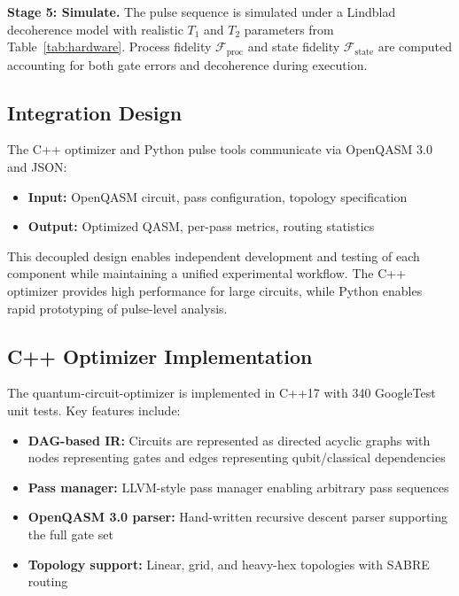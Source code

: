 \documentclass[journal]{IEEEtran}
\newcommand{\fid}{\mathcal{F}}
\begin{document}
\textbf{Stage 5: Simulate.} The pulse sequence is simulated under a Lindblad decoherence model with realistic $T_1$ and $T_2$ parameters from Table~\ref{tab:hardware}. Process fidelity $\fid_{\text{proc}}$ and state fidelity $\fid_{\text{state}}$ are computed accounting for both gate errors and decoherence during execution.

\subsection{Integration Design}

The C++ optimizer and Python pulse tools communicate via OpenQASM 3.0 and JSON:
\begin{itemize}
    \item \textbf{Input:} OpenQASM circuit, pass configuration, topology specification
    \item \textbf{Output:} Optimized QASM, per-pass metrics, routing statistics
\end{itemize}

This decoupled design enables independent development and testing of each component while maintaining a unified experimental workflow. The C++ optimizer provides high performance for large circuits, while Python enables rapid prototyping of pulse-level analysis.

\subsection{C++ Optimizer Implementation}

The quantum-circuit-optimizer is implemented in C++17 with 340 GoogleTest unit tests. Key features include:

\begin{itemize}
    \item \textbf{DAG-based IR:} Circuits are represented as directed acyclic graphs with nodes representing gates and edges representing qubit/classical dependencies
    \item \textbf{Pass manager:} LLVM-style pass manager enabling arbitrary pass sequences
    \item \textbf{OpenQASM 3.0 parser:} Hand-written recursive descent parser supporting the full gate set
    \item \textbf{Topology support:} Linear, grid, and heavy-hex topologies with SABRE routing
\end{itemize}

\end{document}
